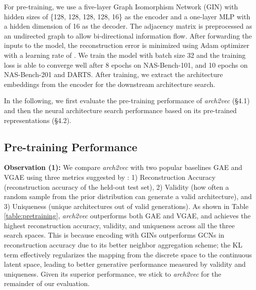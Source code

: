 For pre-training, we use a five-layer Graph Isomorphism Network (GIN) with hidden sizes of \{128, 128, 128, 128, 16\} as the encoder and a one-layer MLP with a hidden dimension of 16 as the decoder. The adjacency matrix is preprocessed as an undirected graph to allow bi-directional information flow. After forwarding the inputs to the model, the reconstruction error is minimized using Adam optimizer \cite{kingma:adam} with a learning rate of . We train the model with batch size 32 and the training loss is able to converge well after 8 epochs on NAS-Bench-101, and 10 epochs on NAS-Bench-201 and DARTS. After training, we extract the architecture embeddings from the encoder for the downstream architecture search.


In the following, we first evaluate the pre-training performance of \textit{arch2vec} (\S4.1) and then the neural architecture search performance based on its pre-trained representations (\S4.2).

\vspace{-1mm}
\subsection{Pre-training Performance} \label{sec:pretraining}
\vspace{-1mm}










\textbf{Observation (1):} We compare \textit{arch2vec} with two popular baselines GAE \cite{kipf2016variational} and VGAE \cite{kipf2016variational} using three metrics suggested by \cite{zhang2019d}: 1) Reconstruction Accuracy (reconstruction accuracy of the held-out test set), 2) Validity (how often a random sample from the prior distribution can generate a valid architecture), and 3) Uniqueness (unique architectures out of valid generations). As shown in Table \ref{table:pretraining}, \textit{arch2vec} outperforms both GAE and VGAE, and achieves the highest reconstruction accuracy, validity, and uniqueness across all the three search spaces. This is because encoding with GINs outperforms GCNs in reconstruction accuracy due to its better neighbor aggregation scheme; the KL term effectively regularizes the mapping from the discrete space to the continuous latent space, leading to better generative performance measured by validity and uniqueness. Given its superior performance, we stick to \textit{arch2vec} for the remainder of our evaluation.    





